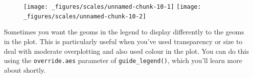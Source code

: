 \begin{Shaded}
\begin{Highlighting}[]
\StringTok{ }
\StringTok{  }\NormalTok{(} \NormalTok{, } \NormalTok{) +}
\StringTok{  }\NormalTok{(}\NormalTok{(}  \NormalTok{) }
\StringTok{ }
\StringTok{  }\NormalTok{(} \NormalTok{, } \NormalTok{, } \NormalTok{) +}
\StringTok{  }\NormalTok{(}\NormalTok{(}  \NormalTok{) }
\end{Highlighting}
\end{Shaded}

\begin{figure}[H]
  \texttt{[image: \_figures/scales/unnamed-chunk-10-1]}%
  \texttt{[image: \_figures/scales/unnamed-chunk-10-2]}
\end{figure}

Sometimes you want the geoms in the legend to display differently to the
geoms in the plot. This is particularly useful when you've used
transparency or size to deal with moderate overplotting and also used
colour in the plot. You can do this using the \texttt{override.aes}
parameter of \texttt{guide\_legend()}, which you'll learn more about
shortly. 

\begin{Shaded}
\begin{Highlighting}[]
\StringTok{ }\NormalTok{(} \NormalTok{(}\NormalTok{), } \NormalTok{(}\NormalTok{))}
\StringTok{ }\NormalTok{, } \NormalTok{(}\NormalTok{, }\NormalTok{, }\NormalTok{))}
\StringTok{ }
\StringTok{  }\NormalTok{(}\NormalTok{(}  \NormalTok{)}
\StringTok{ }
\StringTok{  }\NormalTok{(}\NormalTok{(}  \NormalTok{) +}\StringTok{ }
\StringTok{  }\NormalTok{(} \NormalTok{(} \NormalTok{(} \NormalTok{)))}
\end{Highlighting}
\end{Shaded}

